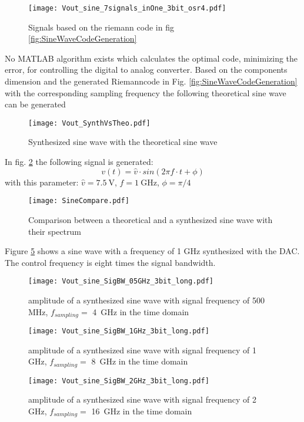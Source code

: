 \begin{figure}[htb!]
   \centering
   \texttt{[image: Vout\_sine\_7signals\_inOne\_3bit\_osr4.pdf]}
   \caption{Signals based on the riemann code in fig \ref{fig:SineWaveCodeGeneration}}
   \label{fig:SineWavesGeneration}
\end{figure}
 
No MATLAB algorithm exists which calculates the optimal code, minimizing the error, for controlling the digital to analog converter. Based on the components dimension and the generated Riemanncode in Fig. \ref{fig:SineWaveCodeGeneration} with the corresponding sampling frequency the following theoretical sine wave can be generated

\begin{figure}[htb!]
   \centering
   \texttt{[image: Vout\_SynthVsTheo.pdf]}
   \caption{Synthesized sine wave with the theoretical sine wave}
   \label{fig:SineWaveSynthVsTheoretical}
\end{figure}
In fig. \ref{fig:SineWaveSynthVsTheoretical} the following signal is generated:
\begin{equation}
v(t)= \widehat{v} \cdot sin( 2  \pi  f \cdot  t + \phi)
\end{equation}
with this parameter: $\widehat{v} = \SI{7.5}{\volt}$, $f = \SI{1}{\giga \hertz}$, $\phi = \pi / 4$


\begin{figure}[htb!]
	\centering
  \texttt{[image: SineCompare.pdf]}
	\caption{Comparison between a theoretical and a synthesized sine wave with their spectrum}
	\label{fig:SineCompare}
\end{figure}


Figure \ref{fig:1GHz sine} shows a sine wave with a frequency of 1 GHz synthesized with the DAC. The control frequency is eight times the signal bandwidth.
\begin{figure}[htb!]
   \centering
   \texttt{[image: Vout\_sine\_SigBW\_05GHz\_3bit\_long.pdf]}
   \caption{amplitude of a synthesized sine wave with signal frequency of 500 MHz, $f_{sampling} =$ \SI{4}{\GHz} in the time domain}
   \label{fig:05GHz sine}
\end{figure}
\begin{figure}[htb!]
   \centering
   \texttt{[image: Vout\_sine\_SigBW\_1GHz\_3bit\_long.pdf]}
   \caption{amplitude of a synthesized sine wave with signal frequency of 1 GHz, $f_{sampling} =$ \SI{8}{\GHz} in the time domain}
   \label{fig:1GHz sine}
\end{figure}
\begin{figure}[htb!]
   \centering
   \texttt{[image: Vout\_sine\_SigBW\_2GHz\_3bit\_long.pdf]}
   \caption{amplitude of a synthesized sine wave with signal frequency of 2 GHz, $f_{sampling} =$ \SI{16}{\GHz} in the time domain}
   \label{fig:2GHz sine}
\end{figure}




